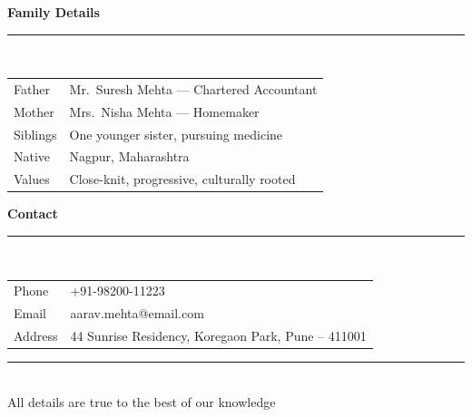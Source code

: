 \documentclass[a4paper,11pt]{article}
\newcommand{\biocard}[1]{%
  \vspace{6pt}%
  {\color{teal}\bfseries\large #1}\\[1pt]
  {\color{line}\rule{\linewidth}{1pt}}\\[3pt]%
}
\begin{document}
\biocard{Family Details}
\begin{tabularx}{\linewidth}{@{}K@{\hspace{8mm}}V@{}}
  Father   & Mr.\ Suresh Mehta — Chartered Accountant \\
  Mother   & Mrs.\ Nisha Mehta — Homemaker \\
  Siblings & One younger sister, pursuing medicine \\
  Native   & Nagpur, Maharashtra \\
  Values   & Close-knit, progressive, culturally rooted \\
\end{tabularx}

\biocard{Contact}
\begin{tabularx}{\linewidth}{@{}K@{\hspace{8mm}}V@{}}
  Phone   & +91-98200-11223 \\
  Email   & aarav.mehta@email.com \\
  Address & 44 Sunrise Residency, Koregaon Park, Pune -- 411001 \\
\end{tabularx}

\vfill
\begin{center}
  {\color{line}\rule{0.5\linewidth}{1pt}}\\[3pt]
  {\color{ink!55}\footnotesize\faHeart[regular]\enspace All details are true to the best of our knowledge \enspace\faHeart[regular]}
\end{center}
\end{document}
